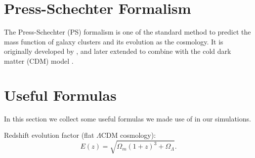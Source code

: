 \documentclass[modern]{aastex61}
\newcommand{\lcdm}{$\Lambda$CDM}
\begin{document}






\appendix

\section{Press-Schechter Formalism}
\label{sec:psf}

The Press-Schechter (PS) formalism is one of the standard method to predict
the mass function of galaxy clusters and its evolution as the cosmology.
It is originally developed by \citet{press1974}, and later extended to combine
with the cold dark matter (CDM) model \citep[e.g.,][]{bond1991,lacey1993}.


\section{Useful Formulas}
\label{sec:formulas}

In this section we collect some useful formulas we made use of in our
simulations.

Redshift evolution factor (flat \lcdm{} cosmology):
\begin{equation}
  \label{eq:ez-func}
  E(z) = \sqrt{\Omega_m(1+z)^3 + \Omega_{\Lambda}}.
\end{equation}
\end{document}
